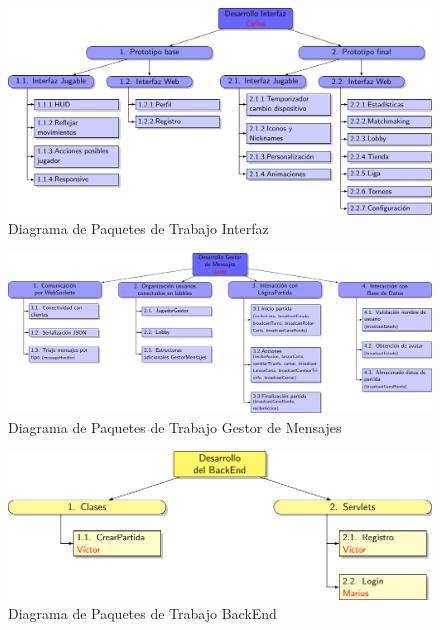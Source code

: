 \begin{figure}[H]
		\centering
		\includegraphics[scale=0.85]{figuras/edtInterfaz.pdf}
		\caption{Diagrama de Paquetes de Trabajo Interfaz}
	\end{figure}

\begin{figure}[H]
		\hspace{-2cm}
		\includegraphics[scale=0.75]{figuras/edtGestorMensajes.pdf}
		\caption{Diagrama de Paquetes de Trabajo Gestor de Mensajes}
	\end{figure}


\begin{figure}[H]
		\centering
		\includegraphics[scale=0.8]{figuras/edtBackend.pdf}
		\caption{Diagrama de Paquetes de Trabajo BackEnd}
	\end{figure}

